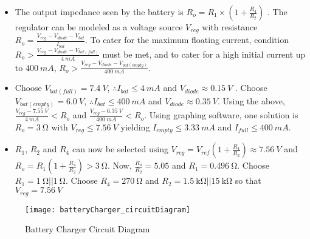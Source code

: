 \begin{itemize}
    \item The output impedance seen by the battery is $R_o = R_1 \times (1 + \frac{R_4}{R_2})$ \cite{datasheet1N5819}.
          The regulator can be modeled as a voltage source $V_{reg}$ with resistance $R_o = \frac{V_{reg} - V_{diode} - V_{bat}}{I_{bat}}$.
          To cater for the maximum floating current, condition $R_o > \frac{V_{reg} - V_{diode} - V_{bat(full)}}{\SI{4}{mA}}$ must be met,
          and to cater for a high initial current up to $\SI{400}{mA}$, $R_o > \frac{V_{reg} - V_{diode} - V_{bat(empty)}}{\SI{400}{mA}}$.
    \item Choose $V_{bat(full)} = \SI{7.4}{V}$, $\therefore I_{bat} \leq \SI{4}{mA}$ and $V_{diode} \approx \SI{0.15}{V}$ \cite{datasheet1N5819}.
          Choose $V_{bat(empty)} = \SI{6.0}{V}$, $\therefore I_{bat} \leq \SI{400}{mA}$ and $V_{diode} \approx \SI{0.35}{V}$. Using the above,
          $\frac{V_{reg} - \SI{7.55}{V}}{\SI{4}{mA}} < R_o$ and $\frac{V_{reg} - \SI{6.35}{V}}{\SI{400}{mA}} < R_o$.
          Using graphing software, one solution is $R_o = \SI{3}{\ohm}$ with $V_{reg} \leq \SI{7.56}{V}$ yielding $I_{empty} \leq \SI{3.33}{mA}$ and $I_{full} \leq \SI{400}{mA}$.
    \item $R_1$, $R_2$ and $R_4$ can now be selected using $V_{reg} = V_{ref} (1 + \frac{R_4}{R_2}) \approx \SI{7.56}{V}$ and $R_o = R_1 (1 + \frac{R_4}{R_2}) > \SI{3}{\ohm}$.
          Now, $\frac{R_4}{R_2} = 5.05$ and $R_1 = \SI{0.496}{\ohm}$. Choose $R_1 = \SI{1}{\ohm} || \SI{1}{\ohm}$.
          Choose $R_4 = \SI{270}{\ohm}$ and $R_2 = \SI{1.5}{\kilo\ohm} || \SI{15}{\kilo\ohm}$ so that $V_{reg} = \SI{7.56}{V}$
\end{itemize}

\begin{figure}[!htb]
  \centering
  \texttt{[image: batteryCharger\_circuitDiagram]}
  \caption{Battery Charger Circuit Diagram}
  \label{fig:batteryCharger_circuitDiagram}
\end{figure}